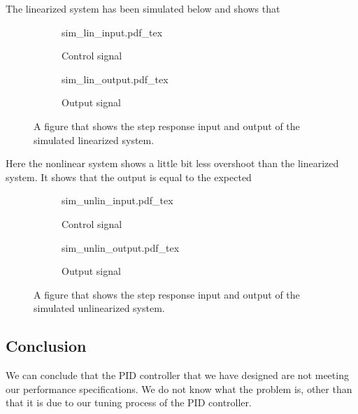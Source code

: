 \documentclass[12pt]{article}
\begin{document}
The linearized system has been simulated below and shows that

\begin{figure}[H]
\centering
\begin{subfigure}{0.5\textwidth}
  \def\svgwidth{\textwidth}
  {sim_lin_input.pdf_tex}
  \label{}
  \centering
  \caption{Control signal} \label{my_input_step_li}
\end{subfigure}%
\begin{subfigure}{0.5\textwidth}
  \centering
  \def\svgwidth{\textwidth}
  {sim_lin_output.pdf_tex}
  \caption{Output signal} \label{my_output_step_li}
\end{subfigure}
\caption{A figure that shows the step response input and output of the simulated linearized system.}
\label{fig:step_li}
\end{figure}

Here the nonlinear system shows a little bit less overshoot than the linearized system. It shows that the output is equal to the expected


\begin{figure}[H]
\centering
\begin{subfigure}{0.5\textwidth}
  \def\svgwidth{\textwidth}
  {sim_unlin_input.pdf_tex}
  \label{}
  \centering
  \caption{Control signal} \label{my_input_step_li}
\end{subfigure}%
\begin{subfigure}{0.5\textwidth}
  \centering
  \def\svgwidth{\textwidth}
  {sim_unlin_output.pdf_tex}
  \caption{Output signal} \label{my_output_step_li}
\end{subfigure}
\caption{A figure that shows the step response input and output of the simulated unlinearized system.}
\label{fig:step_li}
\end{figure}

\subsection*{Conclusion}
We can conclude that the PID controller that we have designed are not meeting our performance specifications. We do not know what the problem is, other than that it is due to our tuning process of the PID controller. 
\end{document}
